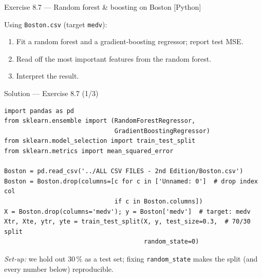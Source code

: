 \documentclass[aspectratio=169,11pt]{beamer}
\begin{document}
\begin{frame}[fragile]{Exercise 8.7 --- Random forest \& boosting on Boston [Python]}
\begin{exercise}
Using \texttt{Boston.csv} (target \texttt{medv}):
\begin{enumerate}
  \item Fit a random forest and a gradient-boosting regressor; report test MSE.
  \item Read off the most important features from the random forest.
  \item Interpret the result.
\end{enumerate}
\end{exercise}
\end{frame}

\begin{frame}[fragile]{Solution --- Exercise 8.7 (1/3)}
\begin{solutionbox}
\begin{lstlisting}
import pandas as pd
from sklearn.ensemble import (RandomForestRegressor,
                              GradientBoostingRegressor)
from sklearn.model_selection import train_test_split
from sklearn.metrics import mean_squared_error

Boston = pd.read_csv('../ALL CSV FILES - 2nd Edition/Boston.csv')
Boston = Boston.drop(columns=[c for c in ['Unnamed: 0']  # drop index col
                              if c in Boston.columns])
X = Boston.drop(columns='medv'); y = Boston['medv']  # target: medv
Xtr, Xte, ytr, yte = train_test_split(X, y, test_size=0.3,  # 70/30 split
                                      random_state=0)
\end{lstlisting}
\emph{Set-up:} we hold out $30\,\%$ as a test set; fixing \texttt{random\_state} makes the split (and every number below) reproducible.
\end{solutionbox}
\end{frame}
\end{document}
